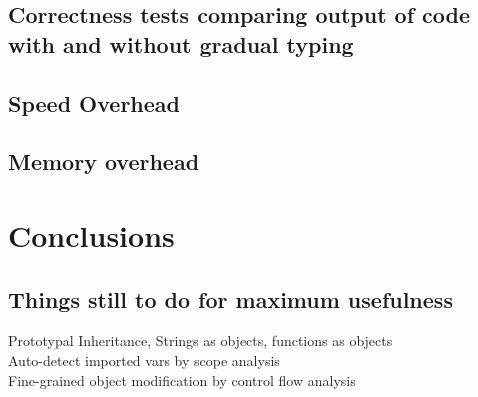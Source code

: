 \documentclass[12pt,a4paper,twoside,openright]{report}
\begin{document}
\section{Correctness tests comparing output of code with and without gradual typing}
\section{Speed Overhead}
\section{Memory overhead}
\chapter{Conclusions}
\section{Things still to do for maximum usefulness}
Prototypal Inheritance, Strings as objects, functions as objects \\
Auto-detect imported vars by scope analysis \\
Fine-grained object modification by control flow analysis
\end{document}
